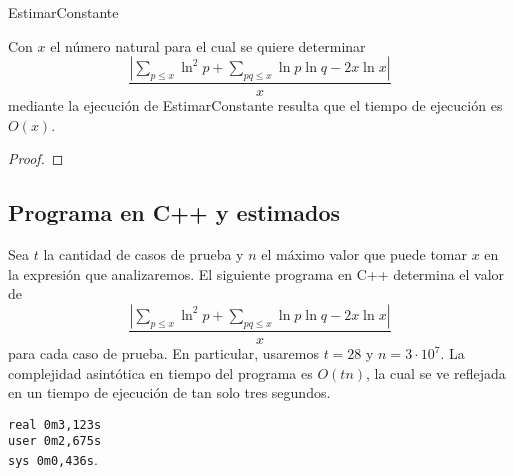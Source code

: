 \begin{algorithm}[H]
\SetAlgoLined
\DontPrintSemicolon
{}
\caption{EstimarConstante}
\end{algorithm}

\begin{theorem}
Con $x$ el n\'umero natural para el cual se quiere determinar
$$\frac{|\sum_{p \leq x} \ln^2 p + \sum_{pq \leq x} \ln p \ln q - 2x\ln x|}{x}$$
mediante la ejecuci\'on de EstimarConstante
resulta que el tiempo de ejecuci\'on es $O(x)$.
\end{theorem}

\begin{proof}
\end{proof}

\subsection{Programa en C++ y estimados}

Sea $t$ la cantidad de casos de prueba y $n$ el m\'aximo valor que puede tomar $x$ en la expresi\'on que analizaremos. 
El siguiente programa en C++ determina el valor de 
$$\frac{|\sum_{p \leq x} \ln^2 p + \sum_{pq \leq x} \ln p \ln q - 2x\ln x|}{x}$$
para cada caso de prueba.
En particular, usaremos $t = 28$ y $n = 3 \cdot 10^7$.
La complejidad asint\'otica en tiempo del programa es $O(tn)$, la cual se ve reflejada en un tiempo de ejecuci\'on
de tan solo tres segundos.

\begin{center}
    \texttt{real	0m3,123s}\\
    \texttt{user	0m2,675s}\\
    \texttt{sys	0m0,436s}.
\end{center}



